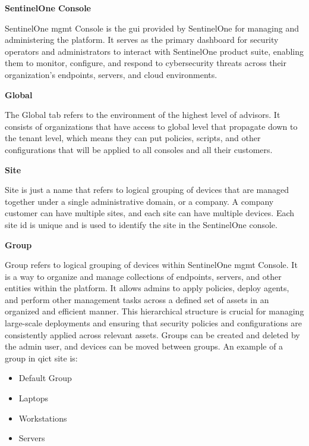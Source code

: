 
\textbf{SentinelOne Console}

SentinelOne \acrshort{mgmt} Console is the \acrshort{gui} provided by SentinelOne for managing and administering the platform. It serves
as the primary dashboard for security operators and administrators to interact with SentinelOne product suite, enabling them to monitor,
configure, and respond to cybersecurity threats across their organization's endpoints, servers, and cloud environments.

\textbf{Global}

The Global tab refers to the environment of the highest level of advisors. It consists of organizations that have access to global level
that propagate down to the tenant level, which means they can put policies, scripts, and other configurations that will be applied to all
consoles and all their customers.

\textbf{Site}

Site is just a name that refers to logical grouping of devices that are managed together under a single administrative domain, or a company.
A company customer can have multiple sites, and each site can have multiple devices. Each site \acrshort{id} is unique and is used to
identify the site in the SentinelOne console.

\textbf{Group}

Group refers to logical grouping of devices within SentinelOne \acrshort{mgmt} Console.  It is a way to organize and manage collections
of endpoints, servers, and other entities within the platform. It allows admins to apply policies, deploy agents, and perform other
management tasks across a defined set of assets in an organized and efficient manner. This hierarchical structure is crucial for
managing large-scale deployments and ensuring that security policies and configurations are consistently applied across relevant assets.
Groups can be created and deleted by the admin user, and devices can be moved between groups. An example of a group in \acrshort{qict}
site is:

\begin{itemize}
      \item Default Group
      \item Laptops
      \item Workstations
      \item Servers
\end{itemize}

